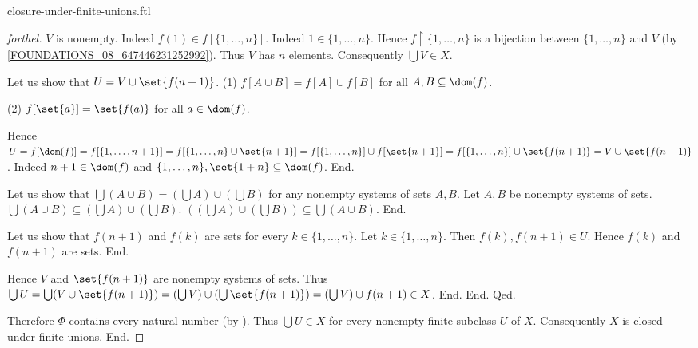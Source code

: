 \documentclass{naproche-library}
\begin{document}
\begin{smodule}[title=Closure Under Finite Unions]{closure-under-finite-unions.ftl}
\begin{proof}[forthel]
          $V$ is nonempty.
          Indeed $f(1) \in f[\{ 1, \dots, n \}]$.
          Indeed $1 \in \{ 1, \dots, n \}$.
          Hence $f \restriction \{ 1, \dots, n \}$ is a bijection between $\{ 1, \dots, n \}$ and $V$ (by \cref{FOUNDATIONS_08_647446231252992}).
          Thus $V$ has $n$ elements.
          Consequently $\bigcup V \in X$.

          Let us show that $U = V \cup \set{f(n + 1)}$. \newline
            (1) $f[A \cup B] = f[A] \cup f[B]$ for all $A, B \subseteq \dom(f)$.

            (2) $f[\set{a}] = \set{f(a)}$ for all $a \in \dom(f)$.

            Hence $U
              = f[\dom(f)]
              = f[\{ 1, \dots, n + 1 \}]
              = f[\{ 1, \dots, n \} \cup \set{n + 1}]
              = f[\{ 1, \dots, n \}] \cup f[\set{n + 1}]
              = f[\{ 1, \dots, n \}] \cup \set{f(n + 1)}
              = V \cup \set{f(n + 1)}$.
            Indeed $n + 1 \in \dom(f)$ and $\{ 1, \dots, n \}, \set{1 + n} \subseteq \dom(f)$.
          End.

          Let us show that $\bigcup (A \cup B) = (\bigcup A) \cup (\bigcup B)$ for any nonempty systems of sets $A, B$.
            Let $A, B$ be nonempty systems of sets.
            $\bigcup (A \cup B) \subseteq (\bigcup A) \cup (\bigcup B)$.
            $((\bigcup A) \cup (\bigcup B)) \subseteq \bigcup (A \cup B)$. %
          End.

          Let us show that $f(n + 1)$ and $f(k)$ are sets for every $k \in \{ 1, \dots, n \}$.
            Let $k \in \{ 1, \dots, n \}$.
            Then $f(k), f(n + 1) \in U$.
            Hence $f(k)$ and $f(n + 1)$ are sets.
          End.

          Hence $V$ and $\set{f(n + 1)}$ are nonempty systems of sets.
          Thus $\bigcup U
            = \bigcup (V \cup \set{f(n + 1)})
            = (\bigcup V) \cup (\bigcup \set{f(n + 1)})
            = (\bigcup V) \cup f(n + 1)
            \in X$.
        End.
      End.
    Qed.

    Therefore $\Phi$ contains every natural number (by ).
    Thus $\bigcup U \in X$ for every nonempty finite subclass $U$ of $X$.
    Consequently $X$ is closed under finite unions.
  End.
\end{proof}
\end{smodule}
\end{document}
